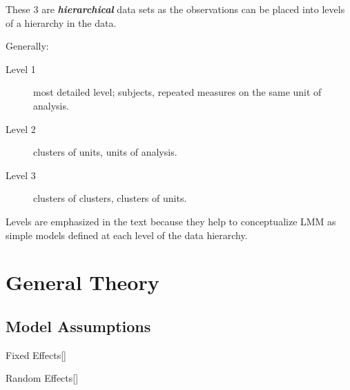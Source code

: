 \documentclass[english]{article}
\begin{document}
\begin{multicols*}{2}
\begin{rappel_enhanced}[Context]
These 3 are \textbf{\textit{hierarchical}} data sets as the observations can be placed into levels of a hierarchy in the data.

\bigskip

Generally:
\begin{description}
	\item[Level 1]	most detailed level; subjects, repeated measures on the same unit of analysis.
	\item[Level 2]	clusters of units, units of analysis.
	\item[Level 3]	clusters of clusters, clusters of units.
\end{description}

\bigskip

Levels are emphasized in the text because they help to conceptualize LMM as simple models defined at each level of the data hierarchy. 
\end{rappel_enhanced}



\section{General Theory}\label{sec:BGenTheory}
\subsection{Model Assumptions}
\begin{definitionGENERAL}{Fixed Effects}[]

\end{definitionGENERAL}

\begin{definitionGENERAL}{Random Effects}[]

\end{definitionGENERAL}



\end{multicols*}
\end{document}
